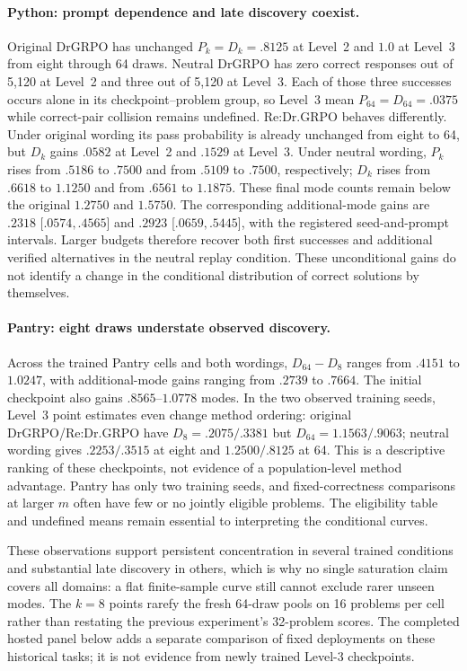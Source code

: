 \documentclass{article}
\newcommand{\1}{\mathbf 1}
\theoremstyle{remark}
\theoremstyle{definition}
\theoremstyle{plain}
\begin{document}
\paragraph{Python: prompt dependence and late discovery coexist.}
Original DrGRPO has unchanged $P_k=D_k=.8125$ at Level~2 and $1.0$ at
Level~3 from eight through 64 draws. Neutral DrGRPO has zero correct responses
out of 5,120 at Level~2 and three out of 5,120 at Level~3. Each of those
three successes occurs alone in its checkpoint--problem group, so Level~3
mean $P_{64}=D_{64}=.0375$ while correct-pair collision remains undefined.
Re:Dr.GRPO behaves differently. Under original wording its pass probability
is already unchanged from eight to 64, but $D_k$ gains $.0582$ at Level~2
and $.1529$ at Level~3. Under neutral wording, $P_k$ rises from $.5186$ to
$.7500$ and from $.5109$ to $.7500$, respectively; $D_k$ rises from $.6618$
to $1.1250$ and from $.6561$ to $1.1875$. These final mode counts remain
below the original $1.2750$ and $1.5750$. The corresponding additional-mode
gains are $.2318$ [$.0574,.4565$] and $.2923$ [$.0659,.5445$], with the
registered seed-and-prompt intervals. Larger budgets therefore recover both
first successes and additional verified alternatives in the neutral replay
condition. These unconditional gains do not identify a change in the
conditional distribution of correct solutions by themselves.

\paragraph{Pantry: eight draws understate observed discovery.}
Across the trained Pantry cells and both wordings, $D_{64}-D_8$ ranges
from $.4151$ to $1.0247$, with additional-mode gains ranging from $.2739$
to $.7664$. The initial checkpoint also gains $.8565$--$1.0778$ modes.
In the two observed training seeds, Level~3 point estimates even change
method ordering: original DrGRPO/Re:Dr.GRPO have $D_8=.2075/.3381$
but $D_{64}=1.1563/.9063$; neutral wording gives $.2253/.3515$ at eight
and $1.2500/.8125$ at 64. This is a descriptive ranking of these checkpoints,
not evidence of a population-level method advantage. Pantry has only two
training seeds, and fixed-correctness comparisons at larger $m$ often have
few or no jointly eligible problems. The eligibility table and undefined
means remain essential to interpreting the conditional curves.

These observations support persistent concentration in several trained
conditions and substantial late discovery in others, which is why no single
saturation claim covers all domains: a flat finite-sample curve still cannot
exclude rarer unseen modes. The $k=8$ points rarefy the fresh 64-draw pools on
16 problems per cell rather than restating the previous experiment's
32-problem scores. The completed hosted panel below
adds a separate comparison of fixed deployments on these historical tasks;
it is not evidence from newly trained Level-3 checkpoints.
\end{document}
